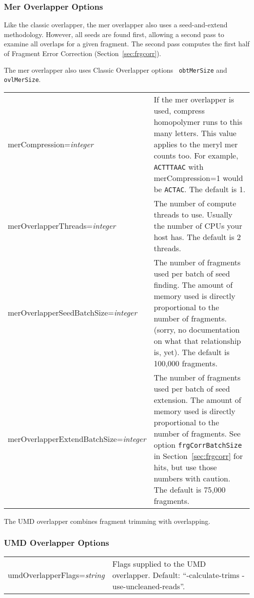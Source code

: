 \documentclass[twoside,11pt]{article}
\begin{document}
\subsubsection{Mer Overlapper Options}

Like the classic overlapper, the mer overlapper also uses a
seed-and-extend methodology.  However, all seeds are found first,
allowing a second pass to examine all overlaps for a given fragment.
The second pass computes the first half of Fragment Error Correction
(Section~\ref{sec:frgcorr}).

The mer overlapper also uses Classic Overlapper options {\tt
obtMerSize} and {\tt ovlMerSize}.

\begin{longtable}{lp{3.0in}}
merCompression={\it integer} &
If the mer overlapper is used, compress homopolymer runs to this many
letters.  This value applies to the meryl mer counts too.  For
example, {\tt ACTTTAAC} with merCompression=1 would be {\tt ACTAC}.
The default is 1.
\\

merOverlapperThreads={\it integer} &
The number of compute threads to use.  Usually the number of CPUs your
host has.
The default is 2 threads.
\\

merOverlapperSeedBatchSize={\it integer} &
The number of fragments used per batch of seed finding.  The amount
of memory used is directly proportional to the number of fragments.
(sorry, no documentation on what that relationship is, yet).
The default is 100,000 fragments.
\\

merOverlapperExtendBatchSize={\it integer} &
The number of fragments used per batch of seed extension.  The amount
of memory used is directly proportional to the number of fragments.
See option {\tt frgCorrBatchSize} in Section~\ref{sec:frgcorr} for
hits, but use those numbers with caution.
The default is 75,000 fragments.
\\

\end{longtable}

The UMD overlapper combines fragment trimming with overlapping.

\subsubsection{UMD Overlapper Options}

\begin{longtable}{lp{3.0in}}
umdOverlapperFlags={\it string} &
Flags supplied to the UMD overlapper.  Default: ``-calculate-trims -use-uncleaned-reads''.
\\
\end{longtable}
\end{document}
